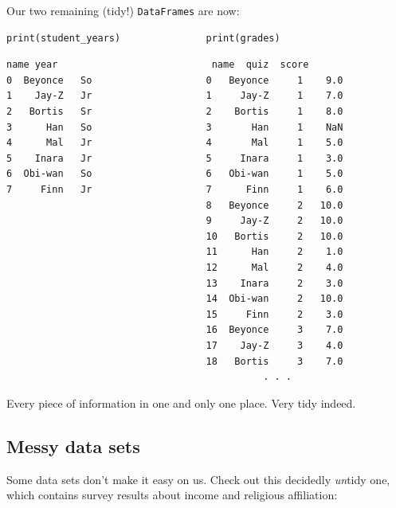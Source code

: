 Our two remaining (tidy!) \texttt{DataFrames} are now:

\pagebreak
\begin{Verbatim}[fontsize=\footnotesize,samepage=true,frame=single,framesep=3mm]
print(student_years)               print(grades)
\end{Verbatim}

\vspace{-.3in}
\begin{Verbatim}[fontsize=\footnotesize,samepage=true,frame=leftline,framesep=5mm,framerule=1mm]
      name year                           name  quiz  score
0  Beyonce   So                    0   Beyonce     1    9.0
1    Jay-Z   Jr                    1     Jay-Z     1    7.0
2   Bortis   Sr                    2    Bortis     1    8.0
3      Han   So                    3       Han     1    NaN
4      Mal   Jr                    4       Mal     1    5.0
5    Inara   Jr                    5     Inara     1    3.0
6  Obi-wan   So                    6   Obi-wan     1    5.0
7     Finn   Jr                    7      Finn     1    6.0
                                   8   Beyonce     2   10.0
                                   9     Jay-Z     2   10.0
                                   10   Bortis     2   10.0
                                   11      Han     2    1.0
                                   12      Mal     2    4.0
                                   13    Inara     2    3.0
                                   14  Obi-wan     2   10.0
                                   15     Finn     2    3.0
                                   16  Beyonce     3    7.0
                                   17    Jay-Z     3    4.0
                                   18   Bortis     3    7.0
                                             . . .
\end{Verbatim}

Every piece of information in one and only one place. Very tidy indeed.

\subsection{Messy data sets}

Some data sets don't make it easy on us. Check out this decidedly
\textit{un}tidy one, which contains survey results about income and religious
affiliation:

